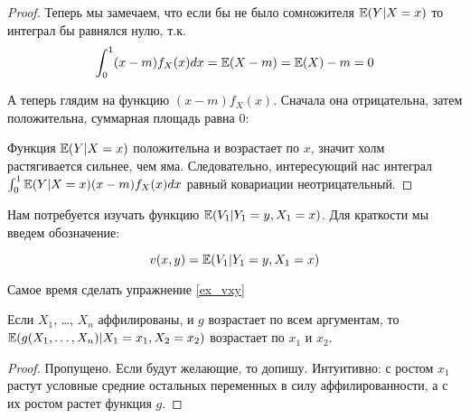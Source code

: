 \begin{proof}
Теперь мы замечаем, что если бы не было сомножителя $ \mathbb{E}(Y|X=x) $ то интеграл бы равнялся нулю, т.к.
\begin{equation}
\int_{0}^{1}(x-m)f_{X}(x)dx=\mathbb{E}(X-m)=\mathbb{E}(X)-m=0
\end{equation}

А теперь глядим на функцию $ (x-m)f_{X}(x) $. Сначала она отрицательна, затем положительна, суммарная площадь равна 0:



Функция $ \mathbb{E}(Y|X=x) $ положительна и возрастает по $ x $, значит холм растягивается сильнее, чем яма. Следовательно, интересующий нас интеграл $ \int_{0}^{1}\mathbb{E}(Y|X=x)(x-m)f_{X}(x)dx $ равный ковариации неотрицательный.


\end{proof}



Нам потребуется изучать функцию $ \mathbb{E}(V_{1}|Y_{1}=y, X_{1}=x) $.  Для краткости мы введем обозначение:

\begin{mydef}
\begin{equation}
v(x,y)=\mathbb{E}(V_{1}|Y_{1}=y, X_{1}=x)
\end{equation}
\end{mydef}

Самое время сделать упражнение \ref{ex_vxy}

\begin{myth}
\label{aff_multi_f}
Если $ X_{1} $, \ldots, $ X_{n} $ аффилированы, и $ g $ возрастает по всем аргументам, то $\mathbb{E}(g(X_{1},\ldots,X_{n})|X_{1}=x_{1},X_{2}=x_{2}) $ возрастает по $ x_{1} $ и $ x_{2} $.
\end{myth}

\begin{proof}
Пропущено. Если будут желающие, то допишу. Интуитивно: с ростом $ x_{1} $ растут условные средние остальных переменных в силу аффилированности, а с их ростом растет функция $ g $.
\end{proof}

